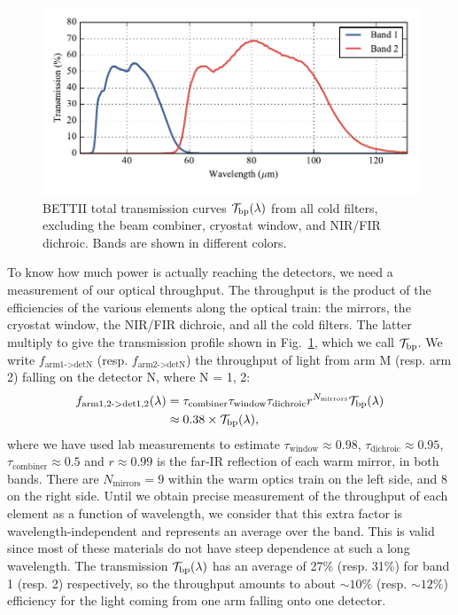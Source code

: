 \begin{figure}[!h]
	\centering
	\includegraphics[width=\textwidth]{Figures/BETTII_transmission.pdf}
	\vspace{-0.5cm}
	\caption[BETTII Transmission curves]{BETTII total transmission curves $\mathcal{T}_\textrm{bp}(\lambda)$ from all cold filters, excluding the beam combiner, cryostat window, and NIR/FIR dichroic. Bands are shown in different colors.}
	\label{fig:BETTIITransmission}
    \end{figure}



To know how much power is actually reaching the detectors, we need a measurement of our optical throughput. The throughput is the product of the efficiencies of the various elements along the optical train: the mirrors, the cryostat window, the NIR/FIR dichroic, and all the cold filters. The latter multiply to give the transmission profile shown in Fig.~\ref{fig:BETTIITransmission}, which we call $\mathcal{T}_\textrm{bp}$. We write $f_\textrm{arm1->detN}$ (resp. $f_\textrm{arm2->detN}$) the throughput of light from arm M (resp. arm 2) falling on the detector N, where N = {1, 2}:
\begin{align}
f_\textrm{arm{1,2}->det{1,2}}(\lambda) &= \tau_\textrm{combiner}\tau_\textrm{window}\tau_\textrm{dichroic}r^{N_\textrm{mirrors}}\mathcal{T}_\textrm{bp}(\lambda) \\
& \approx 0.38\times \mathcal{T}_\textrm{bp}(\lambda),
\end{align}
where we have used lab measurements to estimate $\tau_\textrm{window}\approx 0.98$, $\tau_\textrm{dichroic}\approx 0.95$, $\tau_\textrm{combiner}\approx 0.5$ and $r\approx 0.99 $ is the far-IR reflection of each warm mirror, in both bands. There are $N_\textrm{mirrors} = 9$ within the warm optics train on the left side, and 8 on the right side. Until we obtain precise measurement of the throughput of each element as a function of wavelength, we consider that this extra factor is wavelength-independent and represents an average over the band. This is valid since most of these materials do not have steep dependence at such a long wavelength. The transmission $\mathcal{T}_\textrm{bp}(\lambda)$ has an average of 27\% (resp. 31\%) for band 1 (resp. 2) respectively, so the throughput amounts to about $\sim 10\%$ (resp. $\sim 12\%$) efficiency for the light coming from one arm falling onto one detector. 


